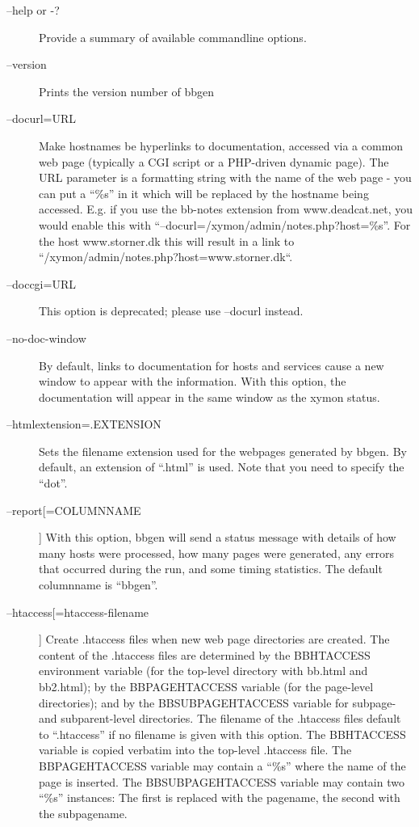  \begin{description}
\item[--help or -?] Provide a summary of available commandline options. 

 

\item[--version] Prints the version number of bbgen 

 

\item[--docurl=URL] Make hostnames be hyperlinks to documentation,
  accessed via a common web page (typically a CGI script or a
  PHP-driven dynamic page). The URL parameter is a formatting string
  with the name of the web page - you can put a ``\%s'' in it which
  will be replaced by the hostname being accessed. E.g. if you use the
  bb-notes extension from www.deadcat.net, you would enable this with
  ``--docurl=/xymon/admin/notes.php?host=\%s''. For the host
  www.storner.dk this will result in a link to
  ``/xymon/admin/notes.php?host=www.storner.dk``. 


 

\item[--doccgi=URL] This option is deprecated; please use --docurl instead. 

 

\item[--no-doc-window] By default, links to documentation for hosts
  and services cause a new window to appear with the information. With
  this option, the documentation will appear in the same window as the
  xymon status. 


 

\item[--htmlextension=.EXTENSION] Sets the filename extension used for
  the webpages generated by bbgen. By default, an extension of
  ``.html'' is used. Note that you need to specify the ``dot''. 


 

\item[--report[=COLUMNNAME]] With this option, bbgen will send a
  status message with details of how many hosts were processed, how
  many pages were generated, any errors that occurred during the run,
  and some timing statistics. The default columnname is ``bbgen''. 


 

\item[--htaccess[=htaccess-filename]] Create .htaccess files when new
  web page directories are created. The content of the .htaccess files
  are determined by the BBHTACCESS environment variable (for the
  top-level directory with bb.html and bb2.html); by the
  BBPAGEHTACCESS variable (for the page-level directories); and by the
  BBSUBPAGEHTACCESS variable for subpage- and subparent-level
  directories. The filename of the .htaccess files default to
  ``.htaccess'' if no filename is given with this option. The
  BBHTACCESS variable is copied verbatim into the top-level .htaccess
  file. The BBPAGEHTACCESS variable may contain a ``\%s'' where the
  name of the page is inserted. The BBSUBPAGEHTACCESS variable may
  contain two ``\%s'' instances: The first is replaced with the
  pagename, the second with the subpagename. 



\end{description}
